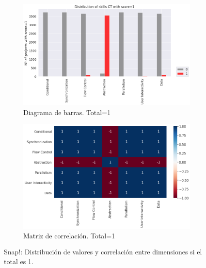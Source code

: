 \documentclass[a4paper, 12pt]{book}
\begin{document}
\begin{figure}[H]
    \centering
    \begin{subfigure}[h]{.49\textwidth} 
        \includegraphics[width=\textwidth]{img/distribucion_1_Snap}
        \caption{Diagrama de barras. Total=1}
        \label{fig:total1_Snap}
    \end{subfigure}       
    \begin{subfigure}[h]{.49\textwidth} 
        \includegraphics[width=\textwidth]{img/corr_1_Snap}
        \caption{Matriz de correlación. Total=1}
        \label{fig:corr1_Snap}
    \end{subfigure}
     \caption{Snap!: Distribución de valores y correlación entre dimensiones si el total es 1.}
\end{figure}
\end{document}

